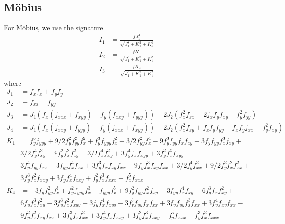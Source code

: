 \documentclass[11pt]{article}
\begin{document}
\subsection{M{\"o}bius}
For $\text{M{\"o}bius}$, we use the signature
\begin{equation}\label{eq:mobiussig}
  \begin{split}
    I_1 &= \frac{fJ_1^4}{\sqrt{J_1^8 + K_1^2 + K_4^2}} \\
    I_2 &= \frac{fK_1}{\sqrt{J_1^8 + K_1^2 + K_4^2}} \\
    I_3 &= \frac{fK_4}{\sqrt{J_1^8 + K_1^2 + K_4^2}}
  \end{split}
\end{equation}
where
\begin{equation*}
  \begin{split}
  J_1 &= f_xf_x + f_yf_y \\
  J_2 &= f_{xx} + f_{yy} \\
  J_3 &= J_1(f_x(f_{xxx} + f_{xyy}) + f_y(f_{xxy} + f_{yyy})) + 
      2J_2(f_x^2f_{xx} + 2f_xf_yf_{xy} + f_y^2f_{yy}) \\
  J_4 &= J_1(f_x(f_{xxy} + f_{yyy}) - f_y(f_{xxx} + f_{xyy})) + 
      2J_2(f_x^2f_{xy} + f_xf_yf_{yy} - f_xf_yf_{xx} - f_y^2f_{xy}) \\
  K_1 &= f_y^5f_{yyy} + 9/2f_y^2f_{yy}^2f_x^2 + f_y^3f_{yyy}f_x^2 + 
      3/2f_{yy}^2f_x^4 -9f_y^3f_{yy}f_xf_{xy} + 3f_yf_{yy}f_x^3f_{xy} + \\
      & 3/2f_y^4f_{xy}^2 - 9f_y^2f_x^2f_{xy}^2 + 
      3/2f_x^4f_{xy}^2 + 3f_y^4f_xf_{xyy} + 3f_y^2f_x^3f_{xyy} + \\
      & 3f_y^4f_{yy}f_{xx} + 3f_{yy}f_x^4f_{xx} + 3f_y^3f_xf_{xy}f_{xx} -
      9f_yf_x^3f_{xy}f_{xx} + 3/2f_y^4f_{xx}^2 + 9/2f_y^2f_x^2f_{xx}^2 + \\
      & 3f_y^3f_x^2f_{xxy} + 3f_yf_x^4f_{xxy} + f_y^2f_x^3f_{xxx} + 
      f_x^5f_{xxx} \\
  K_4 &= -3f_yf_{yy}^2f_x^3 + f_y^2f_{yyy}f_x^3 + f_{yyy}f_x^5 +
  9f_y^2f_{yy}f_x^2f_{xy}   - 3f_{yy}f_x^4f_{xy} - 6f_y^3f_xf_{xy}^2 + \\
  & 6f_yf_x^3f_{xy}^2 -   3f_y^3f_x^2f_{xyy} - 3f_yf_x^4f_{xyy} - 
  3f_y^3f_{yy}f_xf_{xx} +   3f_yf_{yy}f_x^3f_{xx} + 3f_y^4f_{xy}f_{xx} -
  \\
  & 9f_y^2f_x^2f_{xy}f_{xx} + 3f_y^3f_xf_{xx}^2 + 3f_y^4f_xf_{xxy} +
  3f_y^2f_x^3f_{xxy} - f_y^5f_{xxx} - f_y^3f_x^2f_{xxx} \\
\end{split}
\end{equation*}
\end{document}
